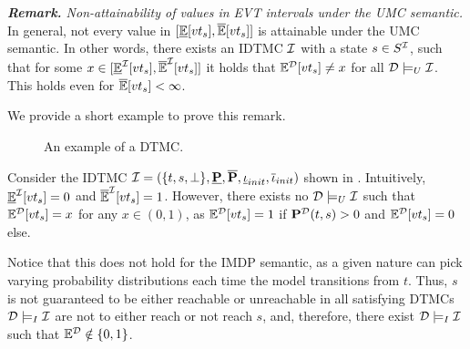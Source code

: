 \emph{\textbf{Remark.} Non-attainability of values in EVT intervals under the UMC semantic.}
\\In general, not every value in $[\mathbb{\underline{E}}[vt_s],\mathbb{\overline{E}}[vt_s]]$ is attainable under the UMC semantic. In other words, there exists an IDTMC $\mathcal{I}$ with a state $s\in S^{\mathcal{I}}$, such that for some $x\in [\mathbb{\underline{E}}^{\mathcal{I}}[vt_s],\mathbb{\overline{E}}^{\mathcal{I}}[vt_s]]$ it holds that $\mathbb{E}^{\mathcal{D}}[vt_s] \neq x$ for all $\mathcal{D} \models_U \mathcal{I}$. This holds even for $\mathbb{\overline{E}}[vt_s] < \infty$.

We provide a short example to prove this remark.

\begin{figure}[h]
\centering
{}
\caption{An example of a DTMC.}
\label{fig:attainable_values_non_infty}
\end{figure}

\begin{example}
    Consider the IDTMC $\mathcal{I} = (\{t,s,\bot\},\mathbf{\underline{P}},\mathbf{\overline{P}},\mathbf{\underline{\iota}}_{init},\mathbf{\overline{\iota}}_{init})$ shown in . Intuitively, $\mathbb{\underline{E}}^{\mathcal{I}}[vt_s] = 0$ and $\mathbb{\overline{E}}^{\mathcal{I}}[vt_s] = 1$. However, there exists no $\mathcal{D} \models_U \mathcal{I}$ such that $\mathbb{E}^{\mathcal{D}}[vt_s] = x$ for any $x \in (0,1)$, as $\mathbb{E}^{\mathcal{D}}[vt_s] = 1$ if $\mathbf{P}^{\mathcal{D}}(t,s) > 0$ and $\mathbb{E}^{\mathcal{D}}[vt_s] = 0$ else.
\end{example}

Notice that this does not hold for the IMDP semantic, as a given nature can pick varying probability distributions each time the model transitions from $t$. Thus, $s$ is not guaranteed to be either reachable or unreachable in all satisfying DTMCs $\mathcal{D} \models_I \mathcal{I}$ are not to either reach or not reach $s$, and, therefore, there exist $\mathcal{D} \models_I \mathcal{I}$ such that $\mathbb{E}^{\mathcal{D}}\notin\{0,1\}$.

